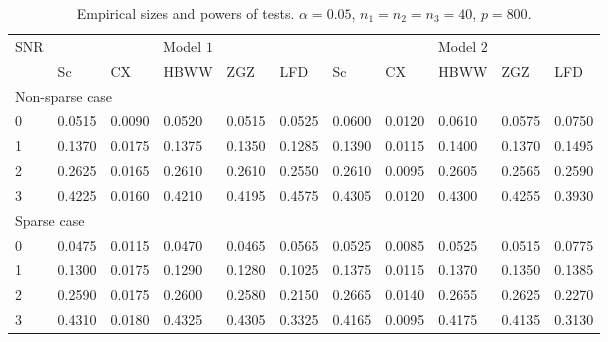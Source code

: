 \documentclass[12pt]{article} %
\theoremstyle{definition}
\begin{document}
\begin{table}[!hbp]
    \caption{Empirical sizes and powers of tests. $\alpha=0.05$, $n_1=n_2=n_3=40$, $p=800$. }
    \label{table3}
    \centering
    \begin{tabular}{*{11}{l}}
    \toprule
    \multirow{2}{*}{SNR} &\multicolumn{5}{c}{Model $1$}&
    \multicolumn{5}{c}{Model $2$} \\
        \cmidrule(r){2-6}\cmidrule(r){7-11}
& Sc & CX & HBWW & ZGZ & LFD & Sc & CX & HBWW & ZGZ & LFD \\ 
    \midrule
    \multicolumn{5}{l}{Non-sparse case}
    \\
    \midrule

 0 & 0.0515 & 0.0090 & 0.0520 & 0.0515 & 0.0525 & 0.0600 & 0.0120 & 0.0610 & 0.0575 & 0.0750 \\ 
      1 & 0.1370 & 0.0175 & 0.1375 & 0.1350 & 0.1285 & 0.1390 & 0.0115 & 0.1400 & 0.1370 & 0.1495 \\ 
      2 & 0.2625 & 0.0165 & 0.2610 & 0.2610 & 0.2550 & 0.2610 & 0.0095 & 0.2605 & 0.2565 & 0.2590 \\ 
      3 & 0.4225 & 0.0160 & 0.4210 & 0.4195 & 0.4575 & 0.4305 & 0.0120 & 0.4300 & 0.4255 & 0.3930 \\ 

    \midrule
    \multicolumn{5}{l}{Sparse case}
    \\
    \midrule

      0 & 0.0475 & 0.0115 & 0.0470 & 0.0465 & 0.0565 & 0.0525 & 0.0085 & 0.0525 & 0.0515 & 0.0775 \\ 
      1 & 0.1300 & 0.0175 & 0.1290 & 0.1280 & 0.1025 & 0.1375 & 0.0115 & 0.1370 & 0.1350 & 0.1385 \\ 
      2 & 0.2590 & 0.0175 & 0.2600 & 0.2580 & 0.2150 & 0.2665 & 0.0140 & 0.2655 & 0.2625 & 0.2270 \\ 
      3 & 0.4310 & 0.0180 & 0.4325 & 0.4305 & 0.3325 & 0.4165 & 0.0095 & 0.4175 & 0.4135 & 0.3130 \\ 





\bottomrule
\end{tabular}
\end{table}
\end{document}
